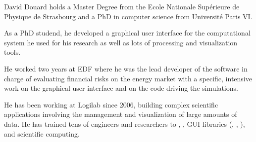 \begin{participant}[type=PI,PM=6,gender=male]{David Douard}
  holds a Master Degree from the Ecole Nationale Sup\'{e}rieure de Physique de
  Strasbourg and a PhD in computer science from Universit\'{e} Paris VI.

  As a PhD studend, he developed a graphical user interface for the
  computational system he used for his research as well as lots of processing
  and visualization tools.

  He worked two years at EDF where he was the lead developer of the software in
  charge of evaluating financial risks on the energy market with a specific,
  intensive work on the graphical user interface and on the code driving the
  simulations.

  He has been working at Logilab since 2006, building complex scientific
  applications involving the management and visualization of large amounts of
  data. He has trained tens of engineers and researchers to ,
  \Python, GUI libraries (, , ),
   and scientific computing.
\end{participant}

